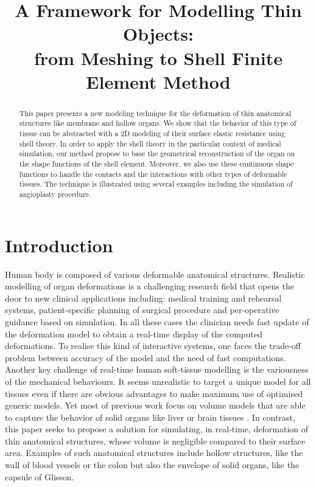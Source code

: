 \documentclass{llncs}
\newcommand{\CD}[1]{{\color{magenta}{\textbf{CD: #1}}}}
\begin{document}
\title{A Framework for Modelling Thin Objects: \\ from Meshing to Shell Finite Element Method}

\maketitle

\begin{abstract}
This paper presents a new modeling technique for the deformation of thin anatomical structures like membrane and hollow organs. 
We show that the behavior of this type of tissue can be abstracted with a 2D modeling of their surface elastic resistance using shell theory. 
In order to apply the shell theory in the particular context of medical simulation, our method propose to base the geometrical reconstruction of the organ on the shape functions of the shell element. 
Moreover, we also use these continuous shape functions to handle the contacts and the interactions with other types of deformable tissues. The technique is illustrated using several examples including the simulation of angioplasty procedure.
\end{abstract}

\section{Introduction}

Human body is composed of various deformable anatomical structures. Realistic modelling of organ deformations is a challenging research field that opens the door to new clinical applications including: medical training and rehearsal systems, patient-specific planning of surgical procedure and per-operative guidance based on simulation. In all these cases the clinician needs fast update of the deformation model to obtain a real-time display of the computed deformations. To realise this kind of interactive systems, one faces the trade-off problem between accuracy of the model and the need of fast computations. 
Another key challenge of real-time human soft-tissue modelling is the variousness of the mechanical behaviours. It seems unrealistic to target a unique model for all tissues even if there are obvious advantages to make maximum use of optimised generic models. Yet most of previous work focus on volume models that are able to capture the behavior of solid organs like liver \cite{} or brain tissues \cite{} \CD{TODO: biblio}. In contrast, this paper seeks to propose a solution for simulating, in real-time, deformation of thin anatomical structures, whose volume is negligible compared to their surface area. Examples of such anatomical structures include hollow structures, like the wall of blood vessels or the colon but also the envelope of solid organs, like the capsule of Glisson.
\end{document}
